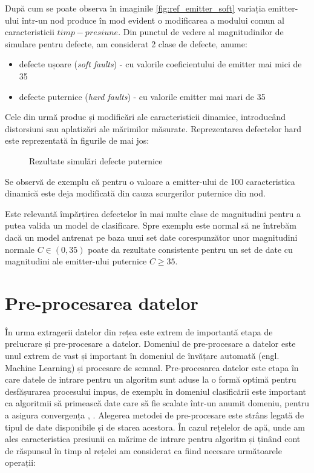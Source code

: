 După cum se poate observa în imaginile \ref{fig:ref_emitter_soft} variația emitter-ului într-un nod produce în mod evident o modificarea a modului comun al caracteristicii $timp-presiune$. Din punctul de vedere al magnitudinilor de simulare pentru defecte, am considerat 2 clase de defecte, anume:
\begin{itemize}
\item defecte ușoare (\emph{soft faults}) - cu valorile coeficientului de emitter mai mici de 35
\item defecte puternice (\emph{hard faults}) - cu valorile emitter mai mari de 35 
\end{itemize}

Cele din urmă produc și modificări ale caracteristicii dinamice, introducând distorsiuni sau aplatizări ale mărimilor măsurate. Reprezentarea defectelor hard este reprezentată în figurile de mai jos:

\begin{figure}[H]

\qquad
{}
\caption{Rezultate simulări defecte puternice}
\label{fig:ref_emitter_hard}
\end{figure}

Se observă de exemplu că pentru o valoare a emitter-ului de 100 caracteristica dinamică este deja modificată din cauza scurgerilor puternice din nod. 

Este relevantă împărțirea defectelor în mai multe clase de magnitudini pentru a putea valida un model de clasificare. Spre exemplu este normal să ne întrebăm dacă un model antrenat pe baza unui set date corespunzător unor magnitudini normale $C \in (0, 35)$ poate da rezultate consistente pentru un set de date cu magnitudini ale emitter-ului puternice $C \geqslant 35$. 

\section{Pre-procesarea datelor}
\label{sec:preproc}
În urma extragerii datelor din rețea este extrem de importantă etapa de prelucrare și pre-procesare a datelor. Domeniul de pre-procesare a datelor este unul extrem de vast și important în domeniul de învățare automată (engl. Machine Learning) și procesare de semnal. Pre-procesarea datelor este etapa în care datele de intrare pentru un algoritm sunt aduse la o formă optimă pentru desfășurarea procesului impus, de exemplu în domeniul clasificării este important ca algoritmii să primească date care să fie scalate într-un anumit domeniu, pentru a asigura convergența \cite{dataPreprocessing}, \cite{GIGO}. Alegerea metodei de pre-procesare este strâns legată de tipul de date disponibile și de starea acestora. În cazul rețelelor de apă, unde am ales caracteristica presiunii ca mărime de intrare pentru algoritm și ținând cont de răspunsul în timp al rețelei am considerat ca fiind necesare următoarele operații:

